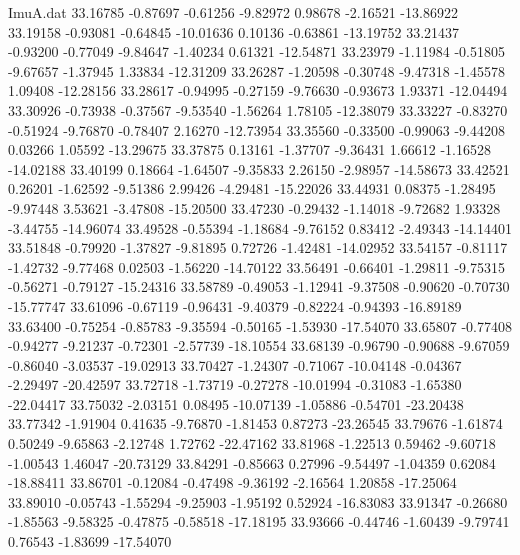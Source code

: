 \begin{filecontents}{ImuA.dat}
  33.16785   -0.87697   -0.61256   -9.82972    0.98678   -2.16521  -13.86922
  33.19158   -0.93081   -0.64845  -10.01636    0.10136   -0.63861  -13.19752
  33.21437   -0.93200   -0.77049   -9.84647   -1.40234    0.61321  -12.54871
  33.23979   -1.11984   -0.51805   -9.67657   -1.37945    1.33834  -12.31209
  33.26287   -1.20598   -0.30748   -9.47318   -1.45578    1.09408  -12.28156
  33.28617   -0.94995   -0.27159   -9.76630   -0.93673    1.93371  -12.04494
  33.30926   -0.73938   -0.37567   -9.53540   -1.56264    1.78105  -12.38079
  33.33227   -0.83270   -0.51924   -9.76870   -0.78407    2.16270  -12.73954
  33.35560   -0.33500   -0.99063   -9.44208    0.03266    1.05592  -13.29675
  33.37875    0.13161   -1.37707   -9.36431    1.66612   -1.16528  -14.02188
  33.40199    0.18664   -1.64507   -9.35833    2.26150   -2.98957  -14.58673
  33.42521    0.26201   -1.62592   -9.51386    2.99426   -4.29481  -15.22026
  33.44931    0.08375   -1.28495   -9.97448    3.53621   -3.47808  -15.20500
  33.47230   -0.29432   -1.14018   -9.72682    1.93328   -3.44755  -14.96074
  33.49528   -0.55394   -1.18684   -9.76152    0.83412   -2.49343  -14.14401
  33.51848   -0.79920   -1.37827   -9.81895    0.72726   -1.42481  -14.02952
  33.54157   -0.81117   -1.42732   -9.77468    0.02503   -1.56220  -14.70122
  33.56491   -0.66401   -1.29811   -9.75315   -0.56271   -0.79127  -15.24316
  33.58789   -0.49053   -1.12941   -9.37508   -0.90620   -0.70730  -15.77747
  33.61096   -0.67119   -0.96431   -9.40379   -0.82224   -0.94393  -16.89189
  33.63400   -0.75254   -0.85783   -9.35594   -0.50165   -1.53930  -17.54070
  33.65807   -0.77408   -0.94277   -9.21237   -0.72301   -2.57739  -18.10554
  33.68139   -0.96790   -0.90688   -9.67059   -0.86040   -3.03537  -19.02913
  33.70427   -1.24307   -0.71067  -10.04148   -0.04367   -2.29497  -20.42597
  33.72718   -1.73719   -0.27278  -10.01994   -0.31083   -1.65380  -22.04417
  33.75032   -2.03151    0.08495  -10.07139   -1.05886   -0.54701  -23.20438
  33.77342   -1.91904    0.41635   -9.76870   -1.81453    0.87273  -23.26545
  33.79676   -1.61874    0.50249   -9.65863   -2.12748    1.72762  -22.47162
  33.81968   -1.22513    0.59462   -9.60718   -1.00543    1.46047  -20.73129
  33.84291   -0.85663    0.27996   -9.54497   -1.04359    0.62084  -18.88411
  33.86701   -0.12084   -0.47498   -9.36192   -2.16564    1.20858  -17.25064
  33.89010   -0.05743   -1.55294   -9.25903   -1.95192    0.52924  -16.83083
  33.91347   -0.26680   -1.85563   -9.58325   -0.47875   -0.58518  -17.18195
  33.93666   -0.44746   -1.60439   -9.79741    0.76543   -1.83699  -17.54070

\end{filecontents}
